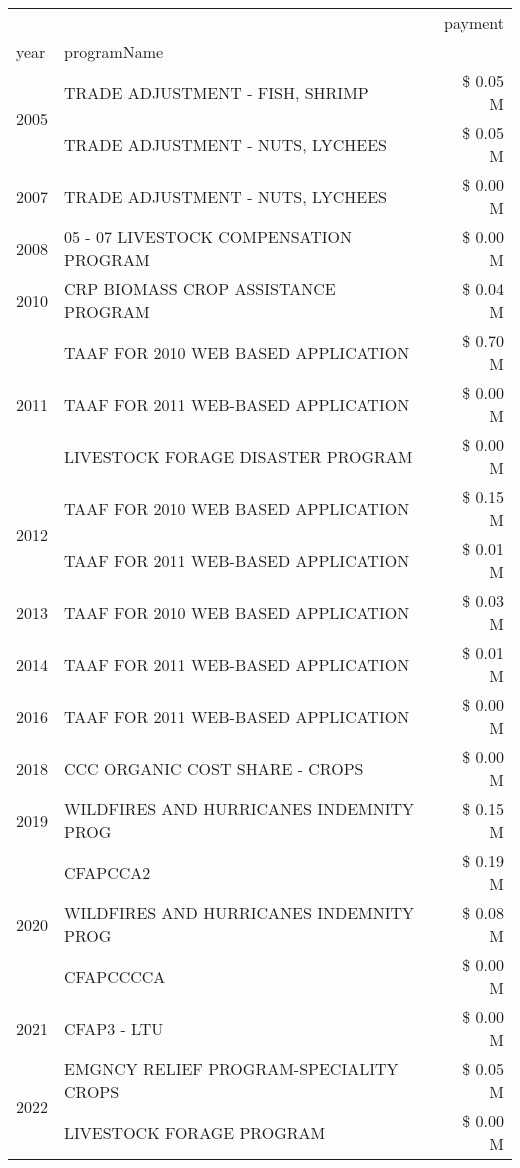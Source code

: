 \begin{tabular}{llr}
\toprule
 &  & payment \\
year & programName &  \\
\midrule
\multirow[t]{2}{*}{2005} & TRADE ADJUSTMENT - FISH, SHRIMP & \$ 0.05 M \\
 & TRADE ADJUSTMENT - NUTS, LYCHEES & \$ 0.05 M \\
\cline{1-3}
2007 & TRADE ADJUSTMENT - NUTS, LYCHEES & \$ 0.00 M \\
\cline{1-3}
2008 & 05 - 07 LIVESTOCK COMPENSATION PROGRAM & \$ 0.00 M \\
\cline{1-3}
2010 & CRP BIOMASS CROP ASSISTANCE PROGRAM & \$ 0.04 M \\
\cline{1-3}
\multirow[t]{3}{*}{2011} & TAAF FOR 2010 WEB BASED APPLICATION & \$ 0.70 M \\
 & TAAF FOR 2011 WEB-BASED APPLICATION & \$ 0.00 M \\
 & LIVESTOCK FORAGE DISASTER PROGRAM & \$ 0.00 M \\
\cline{1-3}
\multirow[t]{2}{*}{2012} & TAAF FOR 2010 WEB BASED APPLICATION & \$ 0.15 M \\
 & TAAF FOR 2011 WEB-BASED APPLICATION & \$ 0.01 M \\
\cline{1-3}
2013 & TAAF FOR 2010 WEB BASED APPLICATION & \$ 0.03 M \\
\cline{1-3}
2014 & TAAF FOR 2011 WEB-BASED APPLICATION & \$ 0.01 M \\
\cline{1-3}
2016 & TAAF FOR 2011 WEB-BASED APPLICATION & \$ 0.00 M \\
\cline{1-3}
2018 & CCC ORGANIC COST SHARE - CROPS & \$ 0.00 M \\
\cline{1-3}
2019 & WILDFIRES AND HURRICANES INDEMNITY PROG & \$ 0.15 M \\
\cline{1-3}
\multirow[t]{3}{*}{2020} & CFAPCCA2 & \$ 0.19 M \\
 & WILDFIRES AND HURRICANES INDEMNITY PROG & \$ 0.08 M \\
 & CFAPCCCCA & \$ 0.00 M \\
\cline{1-3}
2021 & CFAP3 - LTU & \$ 0.00 M \\
\cline{1-3}
\multirow[t]{2}{*}{2022} & EMGNCY RELIEF PROGRAM-SPECIALITY CROPS & \$ 0.05 M \\
 & LIVESTOCK FORAGE PROGRAM & \$ 0.00 M \\
\cline{1-3}
\bottomrule
\end{tabular}
